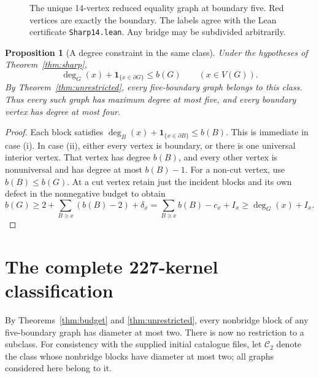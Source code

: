 \documentclass[11pt,a4paper]{article}
\newtheorem{proposition}[theorem]{Proposition}
\theoremstyle{definition}\newtheorem{definition}[theorem]{Definition}
\theoremstyle{remark}\newtheorem{remark}[theorem]{Remark}
\newcommand{\bd}{\partial}
\newcommand{\dd}{\operatorname{deg}}
\newcommand{\ind}{\mathbf 1}
\begin{document}
\begin{figure}[ht]
\centering
{}
\caption{The unique 14-vertex reduced equality graph at boundary five. Red
vertices are exactly the boundary. The labels agree with the Lean certificate
\texttt{Sharp14.lean}. Any bridge may be subdivided arbitrarily.}
\label{fig:sharp}
\end{figure}

\begin{proposition}[A degree constraint in the same class]\label{prop:degree}
Under the hypotheses of Theorem~\ref{thm:sharp},
\[
 \dd_G(x)+\ind_{\{x\in\bd G\}}\le b(G)\qquad(x\in V(G)).
\]
By Theorem~\ref{thm:unrestricted}, every five-boundary graph belongs to this
class. Thus every such graph has maximum degree at most five, and every
boundary vertex has degree at most four.
\end{proposition}
\begin{proof}
Each block satisfies
$\dd_B(x)+\ind_{\{x\in\bd B\}}\le b(B)$. This is immediate in case (i).
In case (ii), either every vertex is boundary, or there is one universal
interior vertex. That vertex has degree $b(B)$, and every other vertex is
nonuniversal and has degree at most $b(B)-1$.
For a non-cut vertex, use $b(B)\le b(G)$. At a cut vertex retain just the
incident blocks and its own defect in the nonnegative budget to obtain
\[
 b(G)\ge2+\sum_{B\ni x}(b(B)-2)+\delta_x
       =\sum_{B\ni x}b(B)-c_x+I_x\ge\dd_G(x)+I_x.
\]
\end{proof}

\section{The complete 227-kernel classification}
By Theorems~\ref{thm:budget} and \ref{thm:unrestricted}, every nonbridge
block of any five-boundary graph has diameter at most two. There is now
no restriction to a subclass. For consistency with the supplied initial
catalogue files, let $\mathcal C_2$ denote the class whose nonbridge
blocks have diameter at most two; all graphs considered here belong to it.
\end{document}
